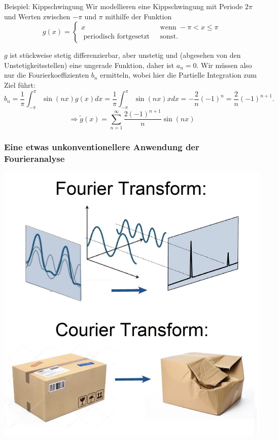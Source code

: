 \documentclass[
	11pt, %
]{beamer}
\begin{document}
\begin{frame}
	\begin{exampleblock}{Beispiel: Kippschwingung}
		Wir modellieren eine Kippschwingung mit Periode $2 \pi$ und Werten zwischen $-\pi$ und $\pi$ mithilfe der Funktion
		$$
		g(x)=\left\{\begin{array}{cl}
			x & \text { wenn }-\pi<x \leq \pi \\
			\text { periodisch fortgesetzt } & \text { sonst. }
		\end{array}\right.
		$$

		 $g$ ist stückweise stetig differenzierbar, aber unstetig und (abgesehen von den Unstetigkeitsstellen) eine ungerade Funktion, daher ist $a_n=0$. Wir müssen also nur die Fourierkoeffizienten $b_n$ ermitteln, wobei hier die Partielle Integration zum Ziel f\"uhrt:
		$$
		b_n=\frac{1}{\pi} \int_{-\pi}^\pi \sin (n x) g(x) d x=\frac{1}{\pi} \int_{-\pi}^\pi \sin (n x) x d x = -\frac{2}{n}(-1)^n= \frac{2}{n}(-1)^{n+1} .
		$$
		$$
		\Rightarrow\widetilde{g}(x)=\sum_{n=1}^{\infty} \frac{2(-1)^{n+1}}{n} \sin (n x)
		$$
	\end{exampleblock}
\end{frame}
\begin{frame}
	\frametitle{Eine etwas unkonventionellere Anwendung der Fourieranalyse}
	\begin{center}
	\includegraphics[scale=0.17]{ct}
	\end{center}
\end{frame}
\end{document}
